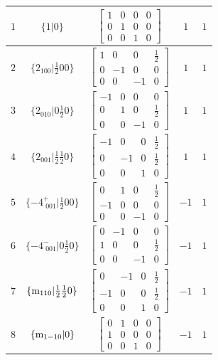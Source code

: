 \documentclass[fleqn,8pt]{jsarticle}
\begin{document}
\begin{longtable}{ccccc}
$ 1 $ & $ \{1|0\} $ & $ \begin{bmatrix} 1 & 0 & 0 & 0 \\ 0 & 1 & 0 & 0 \\ 0 & 0 & 1 & 0 \end{bmatrix} $ & $ 1 $ & $ 1 $ \\ \hline
$ 2 $ & $ \{2{}_{100}|\frac{1}{2} 0 0\} $ & $ \begin{bmatrix} 1 & 0 & 0 & \frac{1}{2} \\ 0 & -1 & 0 & 0 \\ 0 & 0 & -1 & 0 \end{bmatrix} $ & $ 1 $ & $ 1 $ \\ \hline
$ 3 $ & $ \{2{}_{010}|0 \frac{1}{2} 0\} $ & $ \begin{bmatrix} -1 & 0 & 0 & 0 \\ 0 & 1 & 0 & \frac{1}{2} \\ 0 & 0 & -1 & 0 \end{bmatrix} $ & $ 1 $ & $ 1 $ \\ \hline
$ 4 $ & $ \{2{}_{001}|\frac{1}{2} \frac{1}{2} 0\} $ & $ \begin{bmatrix} -1 & 0 & 0 & \frac{1}{2} \\ 0 & -1 & 0 & \frac{1}{2} \\ 0 & 0 & 1 & 0 \end{bmatrix} $ & $ 1 $ & $ 1 $ \\ \hline
$ 5 $ & $ \{-4^{+}_{\,\,001}|\frac{1}{2} 0 0\} $ & $ \begin{bmatrix} 0 & 1 & 0 & \frac{1}{2} \\ -1 & 0 & 0 & 0 \\ 0 & 0 & -1 & 0 \end{bmatrix} $ & $ -1 $ & $ 1 $ \\ \hline
$ 6 $ & $ \{-4^{-}_{\,\,001}|0 \frac{1}{2} 0\} $ & $ \begin{bmatrix} 0 & -1 & 0 & 0 \\ 1 & 0 & 0 & \frac{1}{2} \\ 0 & 0 & -1 & 0 \end{bmatrix} $ & $ -1 $ & $ 1 $ \\ \hline
$ 7 $ & $ \{{\rm m}_{110}|\frac{1}{2} \frac{1}{2} 0\} $ & $ \begin{bmatrix} 0 & -1 & 0 & \frac{1}{2} \\ -1 & 0 & 0 & \frac{1}{2} \\ 0 & 0 & 1 & 0 \end{bmatrix} $ & $ -1 $ & $ 1 $ \\ \hline
$ 8 $ & $ \{{\rm m}_{1-10}|0\} $ & $ \begin{bmatrix} 0 & 1 & 0 & 0 \\ 1 & 0 & 0 & 0 \\ 0 & 0 & 1 & 0 \end{bmatrix} $ & $ -1 $ & $ 1 $ \\ \hline

\end{longtable}
\end{document}
